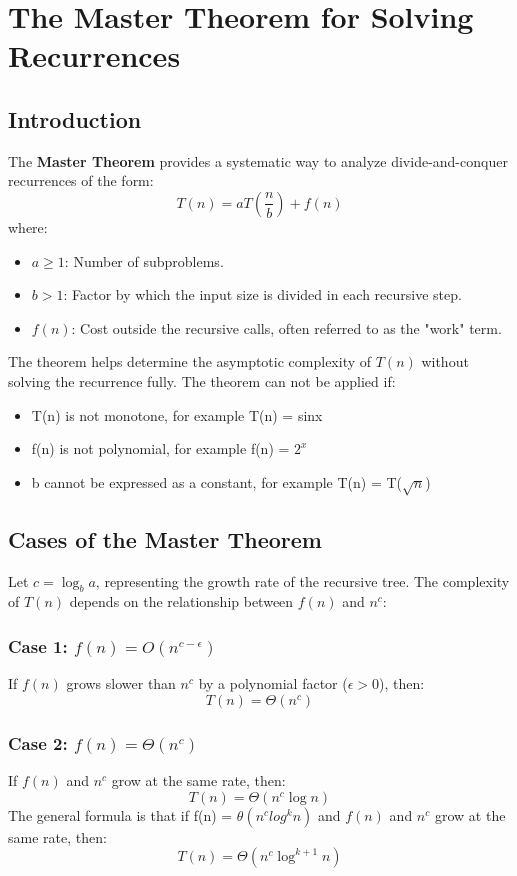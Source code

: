 \chapter{The Master Theorem for Solving Recurrences}

\section{Introduction}

The \textbf{Master Theorem} provides a systematic way to analyze divide-and-conquer recurrences of the form:  
\[
T(n) = aT\left(\frac{n}{b}\right) + f(n)
\]
where:
\begin{itemize}
    \item \(a \geq 1\): Number of subproblems.
    \item \(b > 1\): Factor by which the input size is divided in each recursive step.
    \item \(f(n)\): Cost outside the recursive calls, often referred to as the "work" term.
\end{itemize}
The theorem helps determine the asymptotic complexity of \(T(n)\) without solving the recurrence fully. The theorem can not be applied if:
\begin{itemize}
    \item T(n) is not monotone, for example T(n) = sinx
    \item f(n) is not polynomial, for example f(n) = $2^x$
    \item b cannot be expressed as a constant, for example T(n) = T($\sqrt{n}$)
\end{itemize}

\section{Cases of the Master Theorem}

Let \(c = \log_b a\), representing the growth rate of the recursive tree. The complexity of \(T(n)\) depends on the relationship between \(f(n)\) and \(n^c\):

\subsection{Case 1: \(f(n) = O(n^{c - \epsilon})\)}
If \(f(n)\) grows slower than \(n^c\) by a polynomial factor (\(\epsilon > 0\)), then:  
\[
T(n) = \Theta(n^c)
\]

\subsection{Case 2: \(f(n) = \Theta(n^c)\)}
If \(f(n)\) and \(n^c\) grow at the same rate, then:  
\[
T(n) = \Theta(n^c \log n)
\]
The general formula is that if f(n) = $\theta(n^c log^kn)$ and \(f(n)\) and \(n^c\) grow at the same rate, then:
\[
T(n) = \Theta(n^c \log^{k+1}n)
\]

